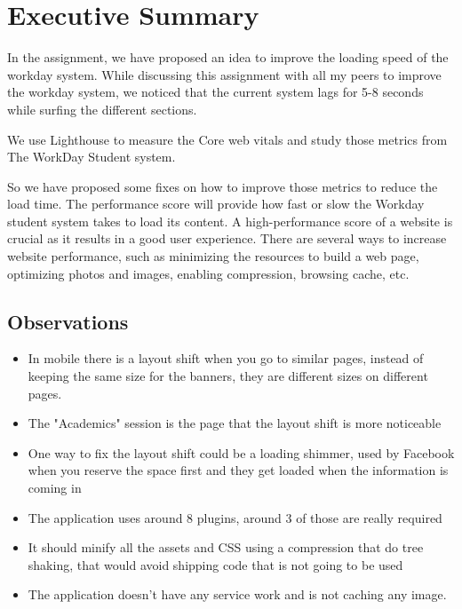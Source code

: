 \section{Executive Summary}
In the assignment, we have proposed an idea to improve the loading speed of the workday system. While discussing this assignment with all my peers to improve the workday system, we noticed that the current system lags for 5-8 seconds while surfing the different sections. \newline\newline

\noindent

We use Lighthouse to measure the Core web vitals and study those metrics from The WorkDay Student system. \newline\newline
\noindent

So we have proposed some fixes on how to improve those metrics to reduce the load time.  \newline\newline
\noindent
The performance score will provide how fast or slow the Workday student system takes to load its content.   \newline\newline
\noindent
A high-performance score of a website is crucial as it results in a good user experience. There are several ways to increase website performance, such as minimizing the resources to build a web page, optimizing photos and images, enabling compression, browsing cache, etc.\newline\newline

\subsection{Observations}
\begin{itemize}
    \item In mobile there is a layout shift when you go to similar pages, instead of keeping the same size for the banners, they are different sizes on different pages.
    \item The "Academics" session is the page that the layout shift is more noticeable
    \item One way to fix the layout shift could be a loading shimmer, used by Facebook when you reserve the space first and they get loaded when the information is coming in
    \item The application uses around 8 plugins, around 3 of those are really required 
    \item It should minify all the assets and CSS using a compression that do tree shaking, that would avoid shipping code that is not going to be used
    \item The application doesn't have any service work and is not caching any image.
\end{itemize}
\pagebreak

